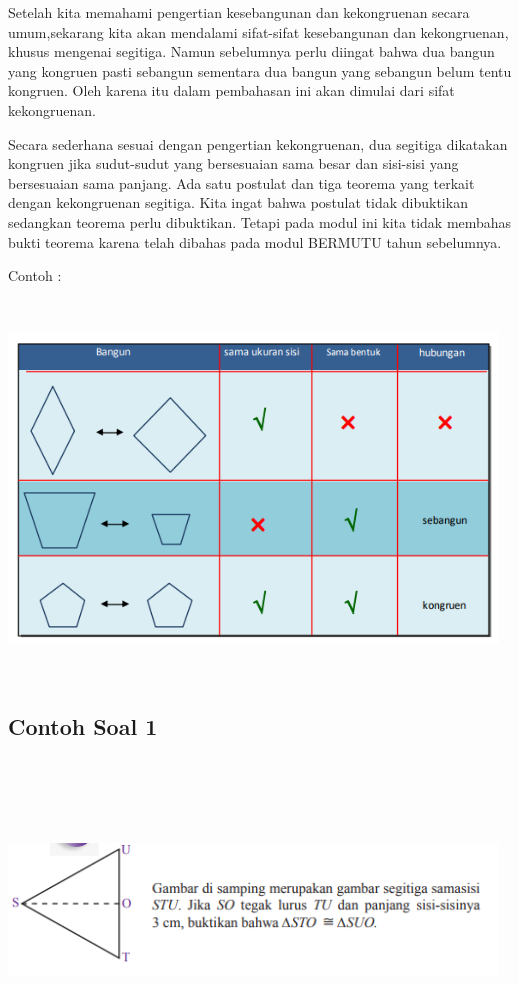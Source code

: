 \documentclass[11pt,fleqn]{book} %
\begin{document}
Setelah kita memahami pengertian kesebangunan dan kekongruenan secara umum,sekarang kita akan mendalami sifat-sifat kesebangunan dan kekongruenan, khusus mengenai segitiga. Namun sebelumnya perlu diingat bahwa dua bangun yang kongruen pasti sebangun sementara dua bangun yang sebangun belum tentu kongruen. Oleh karena itu dalam pembahasan ini akan dimulai dari sifat kekongruenan.

Secara sederhana sesuai dengan pengertian kekongruenan, dua segitiga dikatakan kongruen jika sudut-sudut yang bersesuaian sama besar dan sisi-sisi yang bersesuaian sama panjang. Ada satu postulat dan tiga teorema yang  terkait dengan kekongruenan segitiga. Kita ingat bahwa postulat tidak dibuktikan sedangkan teorema perlu dibuktikan. Tetapi pada modul ini kita tidak membahas bukti teorema karena telah dibahas pada modul BERMUTU tahun sebelumnya. 

Contoh : 

\includegraphics[width = 13cm, height= 10cm]{Pictures/a26.png}

\subsection{Contoh Soal 1}
\includegraphics[width = 13cm, height= 8cm]{Pictures/a22.png}
\end{document}
